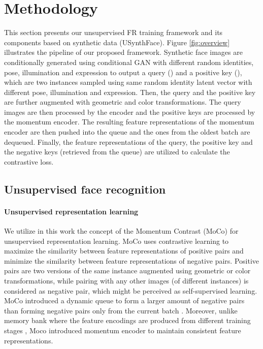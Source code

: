 \documentclass[10pt,twocolumn,letterpaper]{ieeeconf}
\begin{document}
\section{Methodology}
This section presents our unsupervised FR training framework and its components based on synthetic data (USynthFace). Figure \ref{fig:overview} illustrates the pipeline of our proposed framework. Synthetic face images are conditionally generated using conditional GAN with different random identities, pose, illumination and expression to output a query () and a positive key (), which are two instances sampled using same random identity latent vector with different pose, illumination and expression. Then, the query and the positive key are further augmented with geometric and color transformations. The query images are then processed by the encoder and the positive keys are processed by the momentum encoder. The resulting feature representations of the momentum encoder are then pushed into the queue and the ones from the oldest batch are dequeued. Finally, the feature representations of the query, the positive key and the negative keys (retrieved from the queue) are utilized to calculate the contrastive loss.



\subsection{Unsupervised face recognition}

\paragraph{Unsupervised representation learning}




We utilize in this work the concept of the Momentum Contrast (MoCo)\cite{Moco} for unsupervised representation learning.
MoCo uses contrastive learning to maximize the similarity between feature representations of positive pairs and minimize the similarity between feature representations of negative pairs. Positive pairs are two versions of the same instance augmented using geometric or color transformations, while pairing with any other images (of different instances) is considered as negative pair, which might be perceived as self-supervised learning. MoCo introduced a dynamic queue to form a larger amount of negative pairs than forming negative pairs only from the current batch \cite{DBLP:conf/cvpr/YeZYC19,DBLP:conf/iclr/HjelmFLGBTB19}. Moreover, unlike memory bank where the feature encodings are produced from different training stages \cite{DBLP:conf/cvpr/WuXYL18}, Moco introduced momentum encoder to maintain consistent feature representations.
\end{document}
